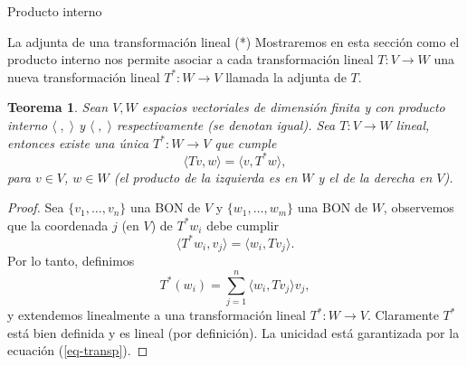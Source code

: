 \documentclass[a4paper,12pt,twoside,spanish,reqno]{amsbook}
\numberwithin{equation}{section}
\newtheorem{teorema}{Teorema}[section]
\newtheorem{proposicion}[teorema]{Proposici\'on}
\theoremstyle{definition}
\newtheorem{definicion}[teorema]{Definici\'on}
\theoremstyle{remark}
\newcommand{\la}{\langle}
\newcommand{\ra}{\rangle}
\newcommand{\R}{\mathbb R}
\begin{document}
\begin{chapter}{Producto interno}


    

    \begin{section}{La adjunta de una transformación lineal (*)}\label{seccion-adjunta-de-una-transformacion-lineal} Mostraremos en esta sección como el producto interno nos permite asociar a cada transformación lineal $T: V \to W$ una nueva transformación  lineal $T^*: W \to V$ llamada la adjunta de $T$. 
	
	
	
        \begin{teorema}
            Sean $V, W$ espacios vectoriales de dimensión finita y con producto interno $\la \;,\;\ra$ y $\la \;,\;\ra$ respectivamente (se denotan igual). Sea $T: V \to W$ lineal, entonces existe una única $T^*: W \to V$ que cumple
            \begin{equation}\label{eq-adjunta}
            \la Tv,w\ra = \la v,T^*w\ra,
            \end{equation}  
            para $v\in V$, $w \in W$ (el producto de la izquierda es en $W$ y el de la derecha en $V$).
        \end{teorema}
        \begin{proof}
        Sea $\{v_1,\ldots,v_n\}$ una BON de $V$ y $\{w_1,\ldots,w_m\}$ una BON de $W$, observemos que la coordenada $j$ (en $V$) de $T^*w_i$ debe cumplir
        \begin{equation}\label{eq-transp}
            \la T^*w_i,v_j\ra = 	\la w_i,Tv_j\ra.
        \end{equation}
        Por lo tanto,  definimos
        \begin{equation*}
            T^*(w_i) = \sum_{j=1}^{n} \la w_i,Tv_j\ra v_j,
        \end{equation*}
        y extendemos linealmente a una transformación lineal $T^*: W \to V$. Claramente $T^*$   está bien definida y es lineal (por definición).  La unicidad está garantizada por la ecuación (\ref{eq-transp}).  
        

\end{proof}
\end{section}
\end{chapter}
\end{document}
